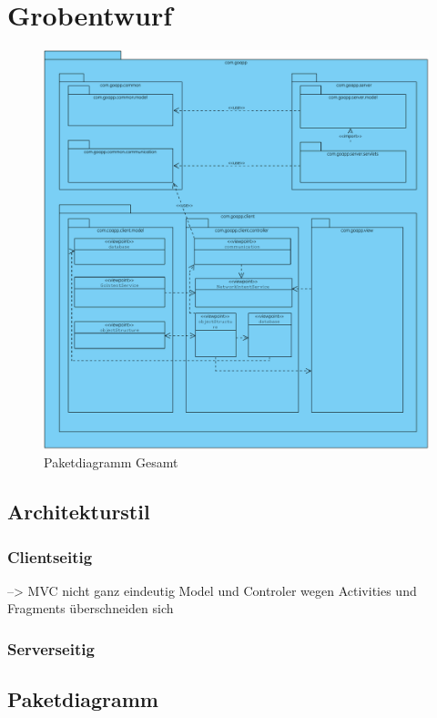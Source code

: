 \section{Grobentwurf}
\begin{figure}[h!]
     \centering
     \hspace*{-0.5cm}\includegraphics[scale=0.5, trim=2 2 2 2, clip=true]{servergraphs/package-server.pdf}
     \caption{Paketdiagramm Gesamt}
\end{figure}
\clearpage
\subsection{Architekturstil}

\subsubsection{Clientseitig}
--> MVC nicht ganz eindeutig Model und Controler wegen Activities und Fragments überschneiden sich

\subsubsection{Serverseitig}

\subsection{Paketdiagramm}





